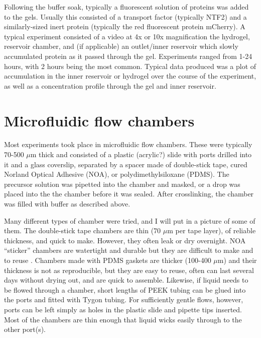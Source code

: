Following the buffer soak, typically a fluorescent solution of proteins was added to the gels.  Usually this consisted of a transport factor (typically NTF2) and a similarly-sized inert protein (typically the red fluorescent protein mCherry).  A typical experiment consisted of a video at 4x or 10x magnification the hydrogel, reservoir chamber, and (if applicable) an outlet/inner reservoir which slowly accumulated protein as it passed through the gel.  Experiments ranged from 1-24 hours, with 2 hours being the most common.  Typical data produced was a plot of accumulation in the inner reservoir or hydrogel over the course of the experiment, as well as a concentration profile through the gel and inner reservoir.

\section{Microfluidic flow chambers}
Most experiments took place in microfluidic flow chambers.  These were typically 70-500 $\mu$m thick and consisted of a plastic (acrylic?) slide with ports drilled into it and a glass coverslip, separated by a spacer made of double-stick tape, cured Norland Optical Adhesive (NOA), or polydimethylsiloxane (PDMS).  The precursor solution was pipetted into the chamber and masked, or a drop was placed into the the chamber before it was sealed.  After crosslinking, the chamber was filled with buffer as described above.

Many different types of chamber were tried, and I will put in a picture of some of them.  The double-stick tape chambers are thin (70 $\mu$m per tape layer), of reliable thickness, and quick to make.  However, they often leak or dry overnight.  NOA ``sticker'' chambers are watertight and durable but they are difficult to make and to reuse \cite{paustian13}.  Chambers made with PDMS gaskets are thicker (100-400 $\mu$m) and their thickness is not as reproducible, but they are easy to reuse, often can last several days without drying out, and are quick to assemble.  Likewise, if liquid needs to be flowed through a chamber, short lengths of PEEK tubing can be glued into the ports and fitted with Tygon tubing.  For sufficiently gentle flows, however, ports can be left simply as holes in the plastic slide and pipette tips inserted.  Most of the chambers are thin enough that liquid wicks easily through to the other port(s).

